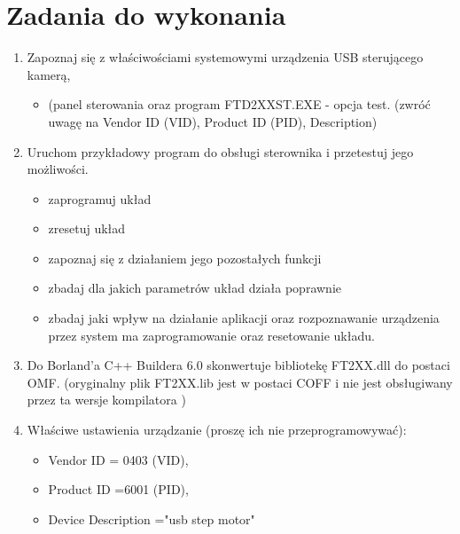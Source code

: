 \documentclass[a4paper,12pt]{extarticle}  %
\begin{document}
\section{Zadania do wykonania}
\begin{enumerate}
	\item Zapoznaj się z właściwościami systemowymi urządzenia USB sterującego kamerą,
	      \begin{itemize}
		      \item (panel sterowania oraz program FTD2XXST.EXE - opcja test. (zwróć uwagę na Vendor ID (VID), Product ID (PID), Description)
	      \end{itemize}

	\item Uruchom przykładowy program do obsługi sterownika i przetestuj jego możliwości.
	      \begin{itemize}
		      \item zaprogramuj układ
		      \item zresetuj układ
		      \item zapoznaj się z działaniem jego pozostałych funkcji
		      \item zbadaj dla jakich parametrów układ działa poprawnie
		      \item zbadaj jaki wpływ na działanie aplikacji oraz rozpoznawanie urządzenia przez system ma zaprogramowanie oraz resetowanie układu.
	      \end{itemize}

	\item Do Borland'a C++ Buildera 6.0  skonwertuje bibliotekę FT2XX.dll do postaci OMF. (oryginalny plik FT2XX.lib jest w postaci COFF i nie jest obsługiwany przez ta wersje kompilatora )
	\item Właściwe ustawienia urządzanie (proszę ich nie przeprogramowywać):
	      \begin{itemize}
		      \item Vendor ID = 0403 (VID),
		      \item Product ID =6001 (PID),
		      \item Device Description ="usb step motor"
	      \end{itemize}


\end{enumerate}
\end{document}

